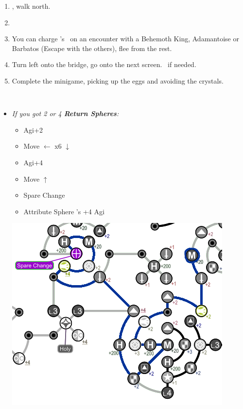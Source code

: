 \begin{enumerate}[resume]
    \item \sd, walk north.
    \item \formation{\tidus}{\kimahri}{\auron}
    \item You can charge \rikku's \od\ on an encounter with a Behemoth King, Adamantoise or Barbatos (Escape with the others), flee from the rest.
    \item Turn left onto the bridge, go onto the next screen. \save\ if needed.
    \item Complete the minigame, picking up the eggs and avoiding the crystals.
\end{enumerate}
\bothvfill\winvfill\lossvfill
\ 
\colend
\begin{spheregrid}
    \begin{multicols}{2}
        \begin{itemize}
            \item \textit{If you got 2 or 4 \textbf{Return Spheres}:}
            \begin{itemize}
                \yunaf Move $\downarrow$
                \item Agi+2
                \item Move $\leftarrow$ x6 $\downarrow$
                \item Agi+4
                \item Move $\uparrow$
                \item Spare Change
                \item Attribute Sphere \kimahri's +4 Agi
            \end{itemize}
            \includegraphics[width=.8\columnwidth]{graphics/4_Return_final_grid}

\end{itemize}
\end{multicols}
\end{spheregrid}

